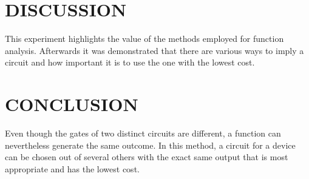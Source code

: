 \documentclass[pdftex,12pt,a4paper]{article}
\begin{document}
\par\vspace{0.5cm}

\section{DISCUSSION}
This experiment highlights the value of the methods employed for function analysis. Afterwards it was demonstrated that there are various ways to imply a circuit and how important it is to use the one with the lowest cost.

\par\vspace{0.5cm}

\section{CONCLUSION}
Even though the gates of two distinct circuits are different, a function can nevertheless generate the same outcome. In this method, a circuit for a device can be chosen out of several others with the exact same output that is most appropriate and has the lowest cost.

\newpage
{}



\end{document}
